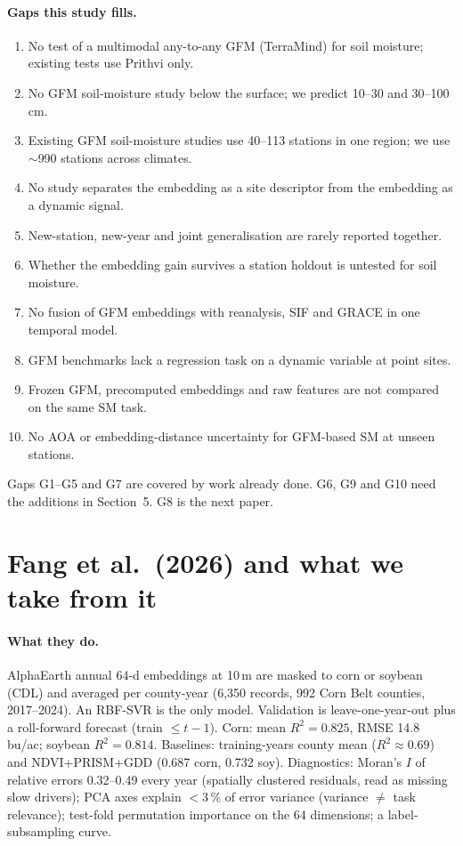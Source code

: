 \documentclass[11pt,a4paper]{article}
\begin{document}
\paragraph{Gaps this study fills.}
\begin{enumerate}[label=G\arabic*.]
\item No test of a multimodal any-to-any GFM (TerraMind) for soil moisture; existing tests use
  Prithvi only.
\item No GFM soil-moisture study below the surface; we predict 10--30 and 30--100\,cm.
\item Existing GFM soil-moisture studies use 40--113 stations in one region; we use $\sim$990
  stations across climates.
\item No study separates the embedding as a site descriptor from the embedding as a dynamic signal.
\item New-station, new-year and joint generalisation are rarely reported together.
\item Whether the embedding gain survives a station holdout is untested for soil moisture.
\item No fusion of GFM embeddings with reanalysis, SIF and GRACE in one temporal model.
\item GFM benchmarks lack a regression task on a dynamic variable at point sites.
\item Frozen GFM, precomputed embeddings and raw features are not compared on the same SM task.
\item No AOA or embedding-distance uncertainty for GFM-based SM at unseen stations.
\end{enumerate}
Gaps G1--G5 and G7 are covered by work already done. G6, G9 and G10 need the additions in
Section~5. G8 is the next paper.

\section{Fang et al.\ (2026) and what we take from it}

\paragraph{What they do.} AlphaEarth annual 64-d embeddings at 10\,m are masked to corn or soybean
(CDL) and averaged per county-year (6{,}350 records, 992 Corn Belt counties, 2017--2024). An
RBF-SVR is the only model. Validation is leave-one-year-out plus a roll-forward forecast
(train $\le t-1$). Corn: mean $R^2=0.825$, RMSE 14.8\,bu/ac; soybean $R^2=0.814$. Baselines:
training-years county mean ($R^2\approx0.69$) and NDVI+PRISM+GDD (0.687 corn, 0.732 soy).
Diagnostics: Moran's $I$ of relative errors 0.32--0.49 every year (spatially clustered residuals,
read as missing slow drivers); PCA axes explain $<$3\,\% of error variance (variance $\neq$ task
relevance); test-fold permutation importance on the 64 dimensions; a label-subsampling curve.
\end{document}
